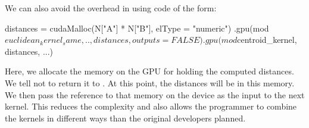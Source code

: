We can also avoid the overhead in  using 
code of the form:
\begin{RCode}
distances = cudaMalloc(N["A"] * N["B"], elType = "numeric")
.gpu(mod$euclidean_kernel_same, .., distances, outputs = FALSE)
.gpu(mod$centroid_kernel, distances, ...) 
\end{RCode}
Here, we allocate the memory on the GPU for holding the computed
distances. We tell  not to return it to \R.
At this point, the distances will be in this memory.
We then pass the reference to that memory on the device as the input
to the next kernel. 
This reduces the complexity and also allows the \R{} programmer
to combine the kernels in different ways than the original
developers planned.


\endinput




